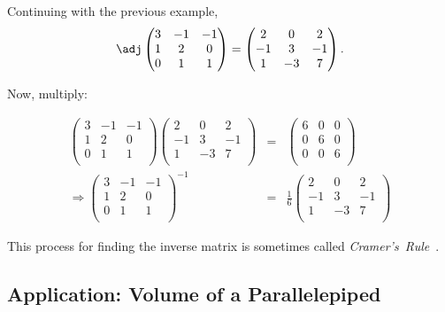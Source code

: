 \begin{example}
Continuing with the previous example,
\[
\adj \begin{pmatrix}
3 & -1 & -1 \\
1 & 2 & 0 \\
0 & 1 & 1 \\
\end{pmatrix} = \begin{pmatrix}
2 & 0 & 2 \\
-1 & 3 & -1 \\
1 & -3 & 7 \\
\end{pmatrix}.
\]

Now, multiply:

\begin{eqnarray*}
\begin{pmatrix}
3 & -1 & -1 \\
1 & 2 & 0 \\
0 & 1 & 1 \\
\end{pmatrix}
\begin{pmatrix}
2 & 0 & 2 \\
-1 & 3 & -1 \\
1 & -3 & 7 \\
\end{pmatrix}
&=&
\begin{pmatrix}
6 & 0 & 0 \\
0 & 6 & 0 \\
0 & 0 & 6 \\
\end{pmatrix} \\[1mm]
\Rightarrow \begin{pmatrix}
3 & -1 & -1 \\
1 & 2 & 0 \\
0 & 1 & 1 \\
\end{pmatrix}^{-1} & = & \frac{1}{6}\begin{pmatrix}
2 & 0 & 2 \\
-1 & 3 & -1 \\
1 & -3 & 7 \\
\end{pmatrix}
\end{eqnarray*}

This process for finding the inverse matrix is sometimes called \emph{Cramer's~Rule}~.
\end{example}

\subsection{Application: Volume of a Parallelepiped}


